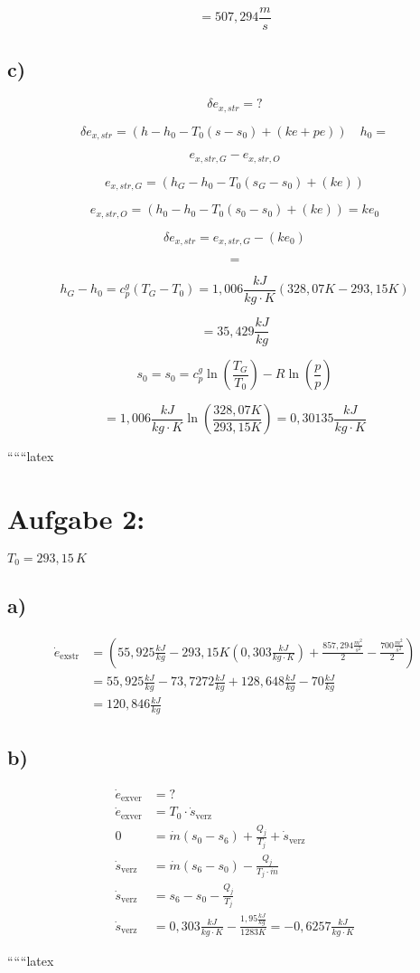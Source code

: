 \[
= 507,294 \frac{m}{s}
\]

\subsection*{c)}

\[
\delta e_{x,str} = ?
\]

\[
\delta e_{x,str} = (h - h_0 - T_0 (s - s_0) + (ke + pe)) \quad h_0 =
\]

\[
e_{x,str,G} - e_{x,str,O}
\]

\[
e_{x,str,G} = (h_G - h_0 - T_0 (s_G - s_0) + (ke))
\]

\[
e_{x,str,O} = (h_0 - h_0 - T_0 (s_0 - s_0) + (ke)) = ke_0
\]

\[
\delta e_{x,str} = e_{x,str,G} - (ke_0)
\]

\[
=
\]

\[
h_G - h_0 = c_p^g (T_G - T_0) = 1,006 \frac{kJ}{kg \cdot K} (328,07K - 293,15K)
\]

\[
= 35,429 \frac{kJ}{kg}
\]

\[
s_0 = s_0 = c_p^g \ln \left( \frac{T_G}{T_0} \right) - R \ln \left( \frac{p}{p} \right)
\]

\[
= 1,006 \frac{kJ}{kg \cdot K} \ln \left( \frac{328,07K}{293,15K} \right) = 0,30135 \frac{kJ}{kg \cdot K}
\]

``````latex


\section*{Aufgabe 2:}
$T_0 = 293,15 \, K$

\subsection*{a)}
\begin{align*}
\dot{e}_{\text{exstr}} &= \left( 55,925 \frac{kJ}{kg} - 293,15 K \left( 0,303 \frac{kJ}{kg \cdot K} \right) + \frac{857,294 \frac{m^2}{s^2}}{2} - \frac{700 \frac{m^2}{s^2}}{2} \right) \\
&= 55,925 \frac{kJ}{kg} - 73,7272 \frac{kJ}{kg} + 128,648 \frac{kJ}{kg} - 70 \frac{kJ}{kg} \\
&= 120,846 \frac{kJ}{kg}
\end{align*}

\subsection*{b)}
\begin{align*}
\dot{e}_{\text{exver}} &= ? \\
\dot{e}_{\text{exver}} &= T_0 \cdot \dot{s}_{\text{verz}} \\
0 &= \dot{m} \left( s_0 - s_6 \right) + \frac{Q_j}{T_j} + \dot{s}_{\text{verz}} \\
\dot{s}_{\text{verz}} &= \dot{m} \left( s_6 - s_0 \right) - \frac{Q_j}{T_j \cdot \dot{m}} \\
\dot{s}_{\text{verz}} &= s_6 - s_0 - \frac{Q_j}{T_j} \\
\dot{s}_{\text{verz}} &= 0,303 \frac{kJ}{kg \cdot K} - \frac{1,95 \frac{kJ}{kg}}{1283 K} = -0,6257 \frac{kJ}{kg \cdot K}
\end{align*}

``````latex


